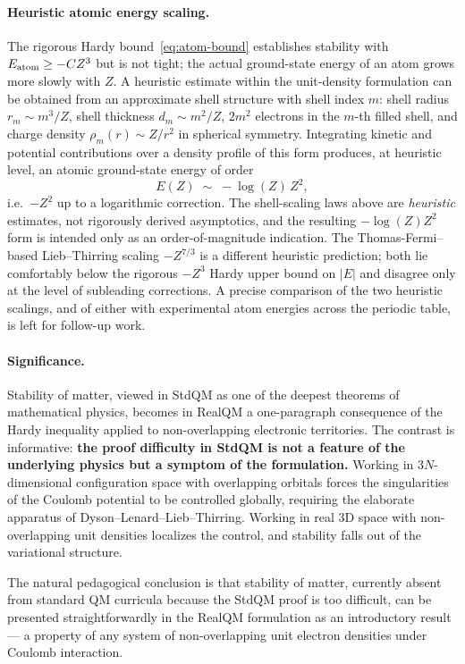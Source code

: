 \documentclass[11pt]{article}
\begin{document}
\paragraph{Heuristic atomic energy scaling.}
The rigorous Hardy bound~\eqref{eq:atom-bound} establishes stability with $E_{\rm atom} \ge -CZ^3$ but is not tight; the actual ground-state energy of an atom grows more slowly with $Z$. A heuristic estimate within the unit-density formulation can be obtained from an approximate shell structure with shell index $m$: shell radius $r_m \sim m^3/Z$, shell thickness $d_m \sim m^2/Z$, $2m^2$ electrons in the $m$-th filled shell, and charge density $\rho_m(r) \sim Z/r^2$ in spherical symmetry. Integrating kinetic and potential contributions over a density profile of this form produces, at heuristic level, an atomic ground-state energy of order
\begin{equation}
E(Z) \;\sim\; -\log(Z)\, Z^2,
\end{equation}
i.e.\ $-Z^2$ up to a logarithmic correction. The shell-scaling laws above are \emph{heuristic} estimates, not rigorously derived asymptotics, and the resulting $-\log(Z)Z^2$ form is intended only as an order-of-magnitude indication. The Thomas-Fermi--based Lieb--Thirring scaling $-Z^{7/3}$ is a different heuristic prediction; both lie comfortably below the rigorous $-Z^3$ Hardy upper bound on $|E|$ and disagree only at the level of subleading corrections. A precise comparison of the two heuristic scalings, and of either with experimental atom energies across the periodic table, is left for follow-up work.

\paragraph{Significance.}
Stability of matter, viewed in StdQM as one of the deepest theorems of mathematical physics, becomes in RealQM a one-paragraph consequence of the Hardy inequality applied to non-overlapping electronic territories. The contrast is informative: \textbf{the proof difficulty in StdQM is not a feature of the underlying physics but a symptom of the formulation.} Working in $3N$-dimensional configuration space with overlapping orbitals forces the singularities of the Coulomb potential to be controlled globally, requiring the elaborate apparatus of Dyson--Lenard--Lieb--Thirring. Working in real 3D space with non-overlapping unit densities localizes the control, and stability falls out of the variational structure.

The natural pedagogical conclusion is that stability of matter, currently absent from standard QM curricula because the StdQM proof is too difficult, can be presented straightforwardly in the RealQM formulation as an introductory result --- a property of any system of non-overlapping unit electron densities under Coulomb interaction.
\end{document}
